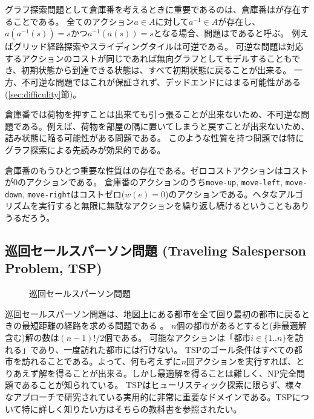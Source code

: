 グラフ探索問題として倉庫番を考えるときに重要であるのは、倉庫番はが存在することである。
全てのアクション$a \in A$に対して$a^{-1} \in A$が存在し、$a(a^{-1}(s)) = s$かつ$a^{-1}(a(s)) = s$となる場合、問題はであると呼ぶ。
例えばグリッド経路探索やスライディングタイルは可逆である。
可逆な問題は対応するアクションのコストが同じであれば無向グラフとしてモデルすることもでき、初期状態から到達できる状態は、すべて初期状態に戻ることが出来る。
一方、不可逆な問題ではこれが保証されず、デッドエンドにはまる可能性がある (\ref{sec:difficulity}節)。

倉庫番では荷物を押すことは出来ても引っ張ることが出来ないため、不可逆な問題である。例えば、荷物を部屋の隅に置いてしまうと戻すことが出来ないため、詰み状態に陥る可能性がある問題である。
このような性質を持つ問題では特にグラフ探索による先読みが効果的である。

倉庫番のもうひとつ重要な性質はの存在である。ゼロコストアクションはコストが0のアクションである。%
倉庫番のアクションのうち{\tt move-up}, {\tt move-left}, {\tt move-down}, {\tt move-right}はコストゼロ($w(e)=0$)のアクションである。ヘタなアルゴリズムを実行すると無限に無駄なアクションを繰り返し続けるということもありうるだろう。


\subsection{巡回セールスパーソン問題 (Traveling Salesperson Problem, TSP)}

\begin{figure}
\centering
\begin{tikzpicture}[scale=0.7]
  
\end{tikzpicture}
\caption{巡回セールスパーソン問題}
\label{fig:tsp}
\end{figure}


巡回セールスパーソン問題は、地図上にある都市を全て回り最初の都市に戻るときの最短距離の経路を求める問題である \cite{applegate2006traveling}。
$n$個の都市があるとすると(非最適解含む)解の数は$(n-1)!/2$個である。
可能なアクションは「都市$i \in \{1..n\}$を訪れる」であり、一度訪れた都市には行けない。
TSPのゴール条件はすべての都市を訪れることである。よって、何も考えずに$n$回アクションを実行すれば、とりあえず解を得ることが出来る。しかし最適解を得ることは難しく、NP完全問題であることが知られている。
TSPはヒューリスティック探索に限らず、様々なアプローチで研究されている実用的に非常に重要なドメインである\cite{applegate2006traveling}。TSPについて特に詳しく知りたい方はそちらの教科書を参照されたい。


